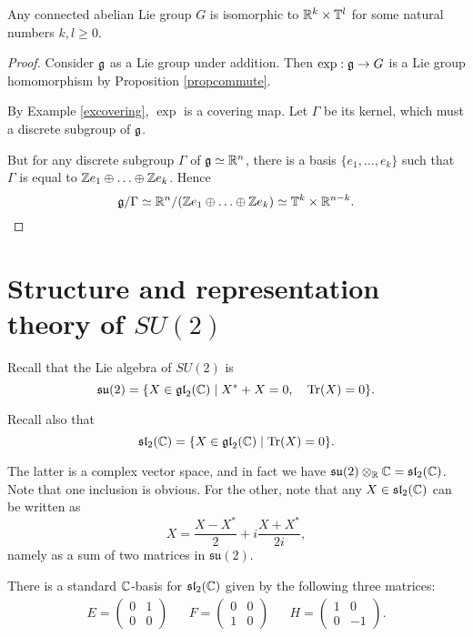 \documentclass[11pt, english]{article}
\begin{document}
\begin{prop}
\label{propabelian}
  Any connected abelian Lie group $G$ is isomorphic to $\mathbb{R}^k \times \mathbb T^l$ for some natural numbers $k,l \geq 0$.
\end{prop}

\begin{proof}
 Consider $\mathfrak g$ as a Lie group under addition. Then $\exp:\mathfrak g \to G$ is a Lie group homomorphism by Proposition \ref{propcommute}.

By Example \ref{excovering}, $\exp$ is a covering map. Let $\Gamma$ be its kernel, which must a discrete subgroup of $\mathfrak g$. 

But for any discrete subgroup $\Gamma$ of $\mathfrak g \simeq \mathbb{R}^n$, there is a basis $\{e_1,\ldots,e_k \}$ such that $\Gamma$ is equal to $\mathbb{Z} e_1 \oplus \ldots \oplus \mathbb{Z} e_k$. Hence
$$
\mathfrak g / \Gamma \simeq \mathbb{R}^n/(\mathbb{Z} e_1 \oplus \ldots \oplus \mathbb{Z} e_k) \simeq \mathbb T^k \times \mathbb{R}^{n-k}.
$$
\end{proof}



\newpage
\section{Structure and representation theory of $SU(2)$}

Recall that the Lie algebra of $SU(2)$ is
$$
\mathfrak{su}(2) = \{ X \in \mathfrak{gl}_2(\mathbb{C}) \mid X^\ast + X = 0, \quad \operatorname{Tr}(X) = 0\} .
$$

Recall also that
$$
\mathfrak{sl}_2(\mathbb{C}) = \{ X \in \mathfrak{gl}_2(\mathbb{C}) \mid \operatorname{Tr}(X) = 0 \}.
$$

The latter is a complex vector space, and in fact we have $\mathfrak{su}(2) \otimes_{\mathbb{R}} \mathbb{C} = \mathfrak{sl}_2(\mathbb{C})$. Note that one inclusion is obvious. For the other, note that any $X \in \mathfrak{sl}_2(\mathbb{C})$ can be written as 
$$
X = \frac{X-X^\ast}{2} + i \frac{X+X^\ast}{2i},
$$
namely as a sum of two matrices in $\mathfrak{su}(2)$. 

There is a standard $\mathbb{C}$-basis for $\mathfrak{sl}_2(\mathbb{C})$ given by the following three matrices:
\begin{align*}
E = \begin{pmatrix}
0 & 1 \\
0 & 0 
\end{pmatrix} &&
F = \begin{pmatrix} 
0 & 0 \\
1 & 0 
\end{pmatrix} &&
H = \begin{pmatrix}
1 & 0 \\
0 & - 1
\end{pmatrix}.
\end{align*}
\end{document}
